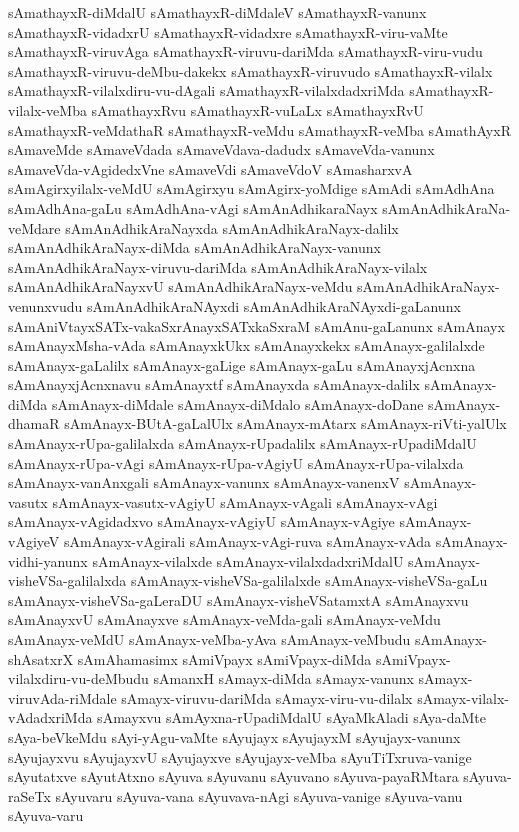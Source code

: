 {sAmathayxR-diMdalU
sAmathayxR-diMdaleV
sAmathayxR-vanunx
sAmathayxR-vidadxrU
sAmathayxR-vidadxre
sAmathayxR-viru-vaMte
sAmathayxR-viruvAga
sAmathayxR-viruvu-dariMda
sAmathayxR-viru-vudu
sAmathayxR-viruvu-deMbu-dakekx
sAmathayxR-viruvudo
sAmathayxR-vilalx
sAmathayxR-vilalxdiru-vu-dAgali
sAmathayxR-vilalxdadxriMda
sAmathayxR-vilalx-veMba
sAmathayxRvu
sAmathayxR-vuLaLx
sAmathayxRvU
sAmathayxR-veMdathaR
sAmathayxR-veMdu
sAmathayxR-veMba
sAmathAyxR
sAmaveMde
sAmaveVdada
sAmaveVdava-dadudx
sAmaveVda-vanunx
sAmaveVda-vAgidedxVne
sAmaveVdi
sAmaveVdoV
sAmasharxvA
sAmAgirxyilalx-veMdU
sAmAgirxyu
sAmAgirx-yoMdige
sAmAdi
sAmAdhAna
sAmAdhAna-gaLu
sAmAdhAna-vAgi
sAmAnAdhikaraNayx
sAmAnAdhikAraNa-veMdare
sAmAnAdhikAraNayxda
sAmAnAdhikAraNayx-dalilx
sAmAnAdhikAraNayx-diMda
sAmAnAdhikAraNayx-vanunx
sAmAnAdhikAraNayx-viruvu-dariMda
sAmAnAdhikAraNayx-vilalx
sAmAnAdhikAraNayxvU
sAmAnAdhikAraNayx-veMdu
sAmAnAdhikAraNayx-venunxvudu
sAmAnAdhikAraNAyxdi
sAmAnAdhikAraNAyxdi-gaLanunx
sAmAniVtayxSATx-vakaSxrAnayxSATxkaSxraM
sAmAnu-gaLanunx
sAmAnayx
sAmAnayxMsha-vAda
sAmAnayxkUkx
sAmAnayxkekx
sAmAnayx-galilalxde
sAmAnayx-gaLalilx
sAmAnayx-gaLige
sAmAnayx-gaLu
sAmAnayxjAcnxna
sAmAnayxjAcnxnavu
sAmAnayxtf
sAmAnayxda
sAmAnayx-dalilx
sAmAnayx-diMda
sAmAnayx-diMdale
sAmAnayx-diMdalo
sAmAnayx-doDane
sAmAnayx-dhamaR
sAmAnayx-BUtA-gaLalUlx
sAmAnayx-mAtarx
sAmAnayx-riVti-yalUlx
sAmAnayx-rUpa-galilalxda
sAmAnayx-rUpadalilx
sAmAnayx-rUpadiMdalU
sAmAnayx-rUpa-vAgi
sAmAnayx-rUpa-vAgiyU
sAmAnayx-rUpa-vilalxda
sAmAnayx-vanAnxgali
sAmAnayx-vanunx
sAmAnayx-vanenxV
sAmAnayx-vasutx
sAmAnayx-vasutx-vAgiyU
sAmAnayx-vAgali
sAmAnayx-vAgi
sAmAnayx-vAgidadxvo
sAmAnayx-vAgiyU
sAmAnayx-vAgiye
sAmAnayx-vAgiyeV
sAmAnayx-vAgirali
sAmAnayx-vAgi-ruva
sAmAnayx-vAda
sAmAnayx-vidhi-yanunx
sAmAnayx-vilalxde
sAmAnayx-vilalxdadxriMdalU
sAmAnayx-visheVSa-galilalxda
sAmAnayx-visheVSa-galilalxde
sAmAnayx-visheVSa-gaLu
sAmAnayx-visheVSa-gaLeraDU
sAmAnayx-visheVSatamxtA
sAmAnayxvu
sAmAnayxvU
sAmAnayxve
sAmAnayx-veMda-gali
sAmAnayx-veMdu
sAmAnayx-veMdU
sAmAnayx-veMba-yAva
sAmAnayx-veMbudu
sAmAnayx-shAsatxrX
sAmAhamasimx
sAmiVpayx
sAmiVpayx-diMda
sAmiVpayx-vilalxdiru-vu-deMbudu
sAmanxH
sAmayx-diMda
sAmayx-vanunx
sAmayx-viruvAda-riMdale
sAmayx-viruvu-dariMda
sAmayx-viru-vu-dilalx
sAmayx-vilalx-vAdadxriMda
sAmayxvu
sAmAyxna-rUpadiMdalU
sAyaMkAladi
sAya-daMte
sAya-beVkeMdu
sAyi-yAgu-vaMte
sAyujayx
sAyujayxM
sAyujayx-vanunx
sAyujayxvu
sAyujayxvU
sAyujayxve
sAyujayx-veMba
sAyuTiTxruva-vanige
sAyutatxve
sAyutAtxno
sAyuva
sAyuvanu
sAyuvano
sAyuva-payaRMtara
sAyuva-raSeTx
sAyuvaru
sAyuva-vana
sAyuvava-nAgi
sAyuva-vanige
sAyuva-vanu
sAyuva-varu
}
